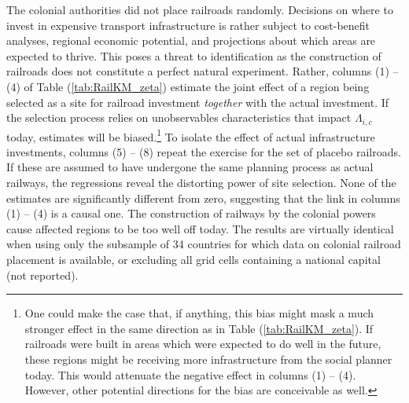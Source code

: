 \documentclass[11pt, oneside]{article}   	%
\let\oldref\ref
\renewcommand{\ref}[1]{(\oldref{#1})}
\begin{document}
The colonial authorities did not place railroads randomly. Decisions on where to invest in expensive transport infrastructure is rather subject to cost-benefit analyses, regional economic potential, and projections about which areas are expected to thrive. This poses a threat to identification as the construction of railroads does not constitute a perfect natural experiment. Rather, columns (1) -- (4) of Table \ref{tab:RailKM_zeta} estimate the joint effect of a region being selected as a site for railroad investment \emph{together} with the actual investment. If the selection process relies on unobservables characteristics that impact $\Lambda_{i,c}$ today, estimates will be biased.\footnote{One could make the case that, if anything, this bias might mask a much stronger effect in the same direction as in Table \ref{tab:RailKM_zeta}. If railroads were built in areas which were expected to do well in the future, these regions might be receiving more infrastructure from the social planner today. This would attenuate the negative effect in columns (1) -- (4). However, other potential directions for the bias are conceivable as well.} To isolate the effect of actual infrastructure investments, columns (5) -- (8) repeat the exercise for the set of placebo railroads. If these are assumed to have undergone the same planning process as actual railways, the regressions reveal the distorting power of site selection. None of the estimates are significantly different from zero, suggesting that the link in columns (1) -- (4) is a causal one. The construction of railways by the colonial powers cause affected regions to be too well off today. The results are virtually identical when using only the subsample of 34 countries for which data on colonial railroad placement is available, or excluding all grid cells containing a national capital (not reported).
\end{document}
